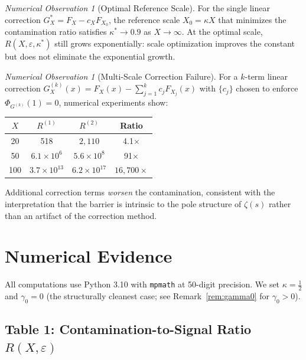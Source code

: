 \documentclass[12pt]{article}
\theoremstyle{remark}
\newtheorem{observation}[theorem]{Numerical Observation}
\begin{document}
\begin{observation}[Optimal Reference Scale]\label{obs:optimal_kappa}
For the single linear correction $G_X^* = F_X - c_X F_{X_0}$,
the reference scale $X_0 = \kappa X$ that minimizes the contamination
ratio satisfies $\kappa^* \to 0.9$ as $X \to \infty$.
At the optimal scale, $R(X,\varepsilon,\kappa^*)$ still grows
exponentially: scale optimization improves the constant but does not
eliminate the exponential growth.
\end{observation}

\begin{observation}[Multi-Scale Correction Failure]\label{obs:multiscale}
For a $k$-term linear correction
$G_X^{(k)}(x) = F_X(x) - \sum_{j=1}^k c_j F_{X_j}(x)$
with $\{c_j\}$ chosen to enforce $\Phi_{G^{(k)}}(1) = 0$,
numerical experiments show:
\begin{center}
\begin{tabular}{@{}cccc@{}}
\toprule
$X$ & $R^{(1)}$ & $R^{(2)}$ & Ratio \\
\midrule
20  & 518            & $2{,}110$        & 4.1$\times$ \\
50  & $6.1\times 10^6$   & $5.6\times 10^8$ & 91$\times$ \\
100 & $3.7\times 10^{13}$ & $6.2\times 10^{17}$ & $16{,}700\times$ \\
\bottomrule
\end{tabular}
\end{center}
Additional correction terms \emph{worsen} the contamination, consistent
with the interpretation that the barrier is intrinsic to the pole structure
of $\zeta(s)$ rather than an artifact of the correction method.
\end{observation}

\section{Numerical Evidence}\label{sec:numerical}

All computations use Python 3.10 with \texttt{mpmath} at 50-digit precision.
We set $\kappa = \tfrac{1}{2}$ and $\gamma_0 = 0$ (the structurally
cleanest case; see Remark~\ref{rem:gamma0} for $\gamma_0 > 0$).

\subsection{Table 1: Contamination-to-Signal Ratio $R(X,\varepsilon)$}
\end{document}

